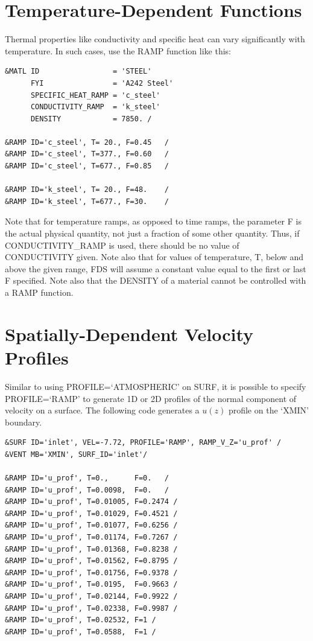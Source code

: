 \documentclass[11pt]{book}
\begin{document}
\section{Temperature-Dependent Functions}
\label{info:RAMP_Temperature}

Thermal properties like conductivity and specific heat can vary significantly with temperature. In such cases, use
the {\ct RAMP} function like this:
\begin{lstlisting}
&MATL ID                 = 'STEEL'
      FYI                = 'A242 Steel'
      SPECIFIC_HEAT_RAMP = 'c_steel'
      CONDUCTIVITY_RAMP  = 'k_steel'
      DENSITY            = 7850. /

&RAMP ID='c_steel', T= 20., F=0.45   /
&RAMP ID='c_steel', T=377., F=0.60   /
&RAMP ID='c_steel', T=677., F=0.85   /

&RAMP ID='k_steel', T= 20., F=48.    /
&RAMP ID='k_steel', T=677., F=30.    /
\end{lstlisting}
Note that for temperature ramps, as opposed to time ramps, the parameter {\ct F} is the actual physical quantity, not just
a fraction of some other quantity. Thus, if {\ct CONDUCTIVITY\_RAMP} is used, there should be no
value of {\ct CONDUCTIVITY} given. Note also that for values of temperature, {\ct T}, below and above the
given range, FDS will assume a constant value equal to the first or last {\ct F} specified. Note also that the {\ct DENSITY} of a material cannot be controlled with a {\ct RAMP} function.


\section{Spatially-Dependent Velocity Profiles}
\label{info:RAMP_Vel_Prof}

Similar to using {\ct PROFILE=`ATMOSPHERIC'} on {\ct SURF}, it is possible to specify {\ct PROFILE=`RAMP'} to generate 1D or 2D profiles of the normal component of velocity on a surface.  The following code generates a $u(z)$ profile on the {\ct `XMIN'} boundary.

\begin{lstlisting}
&SURF ID='inlet', VEL=-7.72, PROFILE='RAMP', RAMP_V_Z='u_prof' /
&VENT MB='XMIN', SURF_ID='inlet'/

&RAMP ID='u_prof', T=0.,      F=0.   /
&RAMP ID='u_prof', T=0.0098,  F=0.   /
&RAMP ID='u_prof', T=0.01005, F=0.2474 /
&RAMP ID='u_prof', T=0.01029, F=0.4521 /
&RAMP ID='u_prof', T=0.01077, F=0.6256 /
&RAMP ID='u_prof', T=0.01174, F=0.7267 /
&RAMP ID='u_prof', T=0.01368, F=0.8238 /
&RAMP ID='u_prof', T=0.01562, F=0.8795 /
&RAMP ID='u_prof', T=0.01756, F=0.9378 /
&RAMP ID='u_prof', T=0.0195,  F=0.9663 /
&RAMP ID='u_prof', T=0.02144, F=0.9922 /
&RAMP ID='u_prof', T=0.02338, F=0.9987 /
&RAMP ID='u_prof', T=0.02532, F=1 /
&RAMP ID='u_prof', T=0.0588,  F=1 /
\end{lstlisting}
\end{document}
